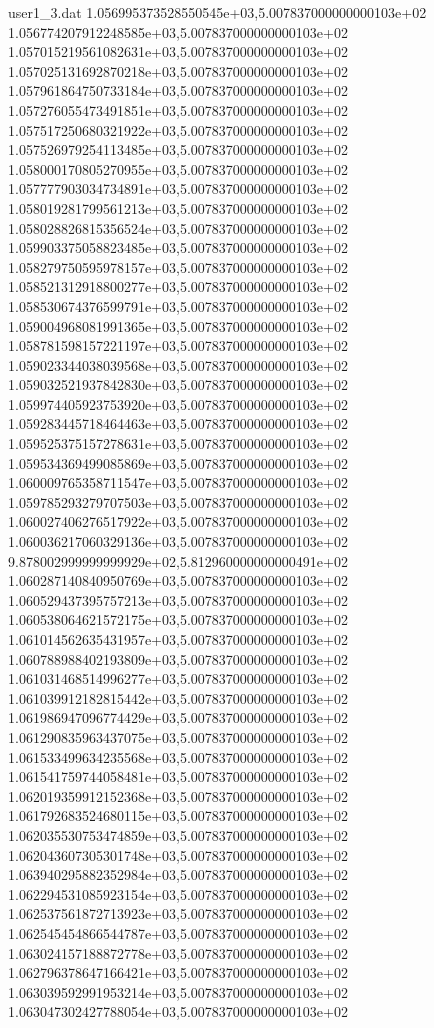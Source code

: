 \begin{filecontents}{user1_3.dat}
1.056995373528550545e+03,5.007837000000000103e+02
1.056774207912248585e+03,5.007837000000000103e+02
1.057015219561082631e+03,5.007837000000000103e+02
1.057025131692870218e+03,5.007837000000000103e+02
1.057961864750733184e+03,5.007837000000000103e+02
1.057276055473491851e+03,5.007837000000000103e+02
1.057517250680321922e+03,5.007837000000000103e+02
1.057526979254113485e+03,5.007837000000000103e+02
1.058000170805270955e+03,5.007837000000000103e+02
1.057777903034734891e+03,5.007837000000000103e+02
1.058019281799561213e+03,5.007837000000000103e+02
1.058028826815356524e+03,5.007837000000000103e+02
1.059903375058823485e+03,5.007837000000000103e+02
1.058279750595978157e+03,5.007837000000000103e+02
1.058521312918800277e+03,5.007837000000000103e+02
1.058530674376599791e+03,5.007837000000000103e+02
1.059004968081991365e+03,5.007837000000000103e+02
1.058781598157221197e+03,5.007837000000000103e+02
1.059023344038039568e+03,5.007837000000000103e+02
1.059032521937842830e+03,5.007837000000000103e+02
1.059974405923753920e+03,5.007837000000000103e+02
1.059283445718464463e+03,5.007837000000000103e+02
1.059525375157278631e+03,5.007837000000000103e+02
1.059534369499085869e+03,5.007837000000000103e+02
1.060009765358711547e+03,5.007837000000000103e+02
1.059785293279707503e+03,5.007837000000000103e+02
1.060027406276517922e+03,5.007837000000000103e+02
1.060036217060329136e+03,5.007837000000000103e+02
9.878002999999999929e+02,5.812960000000000491e+02
1.060287140840950769e+03,5.007837000000000103e+02
1.060529437395757213e+03,5.007837000000000103e+02
1.060538064621572175e+03,5.007837000000000103e+02
1.061014562635431957e+03,5.007837000000000103e+02
1.060788988402193809e+03,5.007837000000000103e+02
1.061031468514996277e+03,5.007837000000000103e+02
1.061039912182815442e+03,5.007837000000000103e+02
1.061986947096774429e+03,5.007837000000000103e+02
1.061290835963437075e+03,5.007837000000000103e+02
1.061533499634235568e+03,5.007837000000000103e+02
1.061541759744058481e+03,5.007837000000000103e+02
1.062019359912152368e+03,5.007837000000000103e+02
1.061792683524680115e+03,5.007837000000000103e+02
1.062035530753474859e+03,5.007837000000000103e+02
1.062043607305301748e+03,5.007837000000000103e+02
1.063940295882352984e+03,5.007837000000000103e+02
1.062294531085923154e+03,5.007837000000000103e+02
1.062537561872713923e+03,5.007837000000000103e+02
1.062545454866544787e+03,5.007837000000000103e+02
1.063024157188872778e+03,5.007837000000000103e+02
1.062796378647166421e+03,5.007837000000000103e+02
1.063039592991953214e+03,5.007837000000000103e+02
1.063047302427788054e+03,5.007837000000000103e+02

\end{filecontents}
